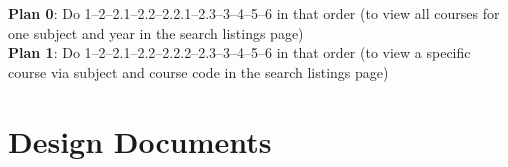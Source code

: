 \documentclass[12pt]{article}
\begin{document}
\textbf{Plan 0}: Do 1--2--2.1--2.2--2.2.1--2.3--3--4--5--6 in that order (to view all courses for one subject and year in the search listings page)\\

\textbf{Plan 1}: Do 1--2--2.1--2.2--2.2.2--2.3--3--4--5--6 in that order (to view a specific course via subject and course code in the search listings page)

\newpage
\section{Design Documents}
\end{document}
